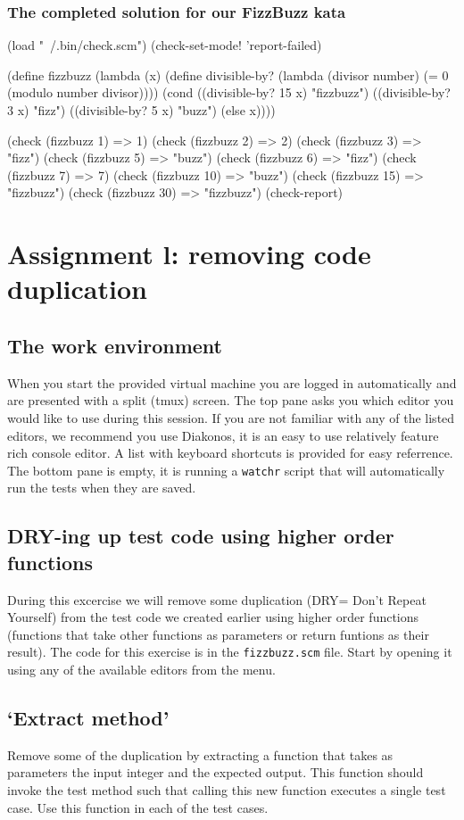 \documentclass[12pt,a4paper,english,twoside]{article}
\begin{document}
\subsubsection{The completed solution for our FizzBuzz kata}
\begin{schemecode}
(load "~/.bin/check.scm")
(check-set-mode! 'report-failed)

(define fizzbuzz 
  (lambda (x) 
    (define divisible-by?  
      (lambda (divisor number)
        (= 0 (modulo number divisor))))
    (cond ((divisible-by? 15 x) "fizzbuzz")
        ((divisible-by? 3 x) "fizz")
        ((divisible-by? 5 x) "buzz")
          (else x))))

(check (fizzbuzz 1) => 1)
(check (fizzbuzz 2) => 2)
(check (fizzbuzz 3) => "fizz")
(check (fizzbuzz 5) => "buzz")
(check (fizzbuzz 6) => "fizz")
(check (fizzbuzz 7) => 7)
(check (fizzbuzz 10) => "buzz")
(check (fizzbuzz 15) => "fizzbuzz")
(check (fizzbuzz 30) => "fizzbuzz")
(check-report)
\end{schemecode}
\section{Assignment l: removing code duplication}
\subsection{The work environment}
When you start the provided virtual machine you are logged in automatically 
and are presented with a split (tmux) screen. The top pane asks you which editor you 
would like to use during this session. If you are not familiar with any of the listed editors, we recommend you use Diakonos, it is an easy to use relatively feature rich console editor. A list with keyboard shortcuts is provided for easy referrence. The bottom pane is empty, it is running a \texttt{watchr} script that will automatically run the tests when they are 
saved. 
\subsection{DRY-ing up test code using higher order functions}
During this excercise we will remove some duplication (DRY= Don't Repeat 
Yourself) from the test code we created earlier using higher order functions 
(functions that take other functions as parameters or return funtions as their 
result). The code for this exercise is in the \texttt{fizzbuzz.scm} file.  
Start by opening it using any of the available editors from the menu.  
\subsection{`Extract method'}
Remove some of the duplication by extracting a function that takes as 
parameters the input integer and the expected output. This function should 
invoke the test method such that calling this new function executes a single 
test case. Use this function in each of the test cases.
\end{document}
